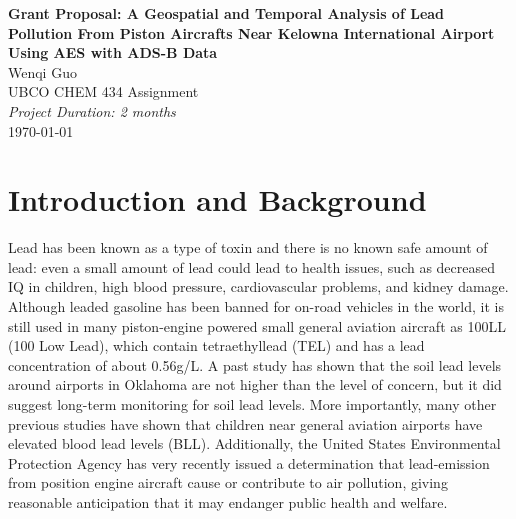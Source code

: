 \documentclass[12pt]{article}
\begin{document}
\begin{center}
    \Large{\textbf{Grant Proposal: A Geospatial and Temporal Analysis of Lead Pollution From Piston Aircrafts Near Kelowna International Airport Using AES with ADS-B Data}}\\
    \vspace{1cm}
    \large{Wenqi Guo}\\
    \vspace{0.5cm}
    \large{UBCO CHEM 434 Assignment}\\
    \vspace{0.5cm}
    \textit{Project Duration: 2 months}\\
    \vspace{0.5cm}
    \vspace{0.5cm}
    \vspace{1cm}
    \vspace{1cm}
    \today
\end{center}
\newpage

\section{Introduction and Background}
Lead has been known as a type of toxin and there is no known safe amount of lead: even a small amount of lead could lead to health issues, such as decreased IQ in children, high blood pressure, cardiovascular problems, and kidney damage. \supercite{world_health_organization_lead_2023} Although leaded gasoline has been banned for on-road vehicles in the world, it is still used in many piston-engine powered small general aviation aircraft as 100LL (100 Low Lead), which contain tetraethyllead (TEL) and has a lead concentration of about 0.56g/L. 
\supercite{noauthor_safety_2021} A past study has shown that the soil lead levels around airports in Oklahoma are not higher than the level of concern, but it did suggest long-term monitoring for soil lead levels. \supercite{mccumber_geospatial_2017} More importantly, many other previous studies have shown that children near general aviation airports have elevated blood lead levels (BLL). \supercite{miranda_geospatial_2011} \supercite{zahran_leaded_2023} \supercite{mills_lead_2022} \supercite{zahran_effect_2017} Additionally, the United States Environmental Protection Agency has very recently issued a determination that lead-emission from position engine aircraft cause or contribute to air pollution, giving reasonable anticipation that it may endanger public health and welfare. \supercite{us_epa_epa_2023}
\end{document}
